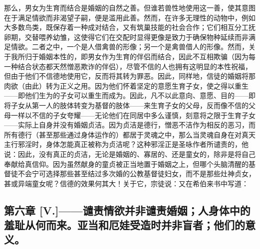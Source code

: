 那么，男女为生育而结合是婚姻的自然之善。但谁若兽性地使用这一善，使其意图在于满足情欲而非渴望子嗣，便是滥用此善。然而，在许多无理性的动物中，例如大多数鸟类，既保存着一种成对结合，又有筑巢技能的社会合作；它们相互分工抚卵期，交替喂养幼雏，这使得它们在交配时显得更像是致力于确保物种延续而非满足情欲。二者之中，一个是人借禽兽的形像；另一个是禽兽借人的形像。然而，关于我所归于婚姻本性的，即男女作为生育的伴侣而结合，因此不互相欺骗（因为每一种结合状态都天然憎恶欺诈的伴侣），尽管不信的人也拥有这明显的本性祝福，但由于他们不信德地使用它，反而将其转为罪恶。因此，同样地，信徒的婚姻将那肉欲（由此）转为正义之用。因为他们怀着坚定的意愿生育子女，使之得以重生——即他们生为的子女可以重生而成为。因此，凡不以此意向、意愿、目的——即将子女从第一人的肢体转变为基督的肢体——来生育子女的父母，反而像不信的父母一样以不信的子女夸耀——无论他们在同居中多么谨慎，刻意将之限于生育子女——实际上自身并没有婚姻贞洁。因为贞洁是德行，憎恶不洁作为相反的恶习，而所有德行（甚至那些通过身体运作的）都居于灵魂之中，那么当灵魂自身在对真天主行邪淫时，身体怎能真正被称为贞洁呢？这种邪淫正是圣咏作者所谴责的，他说：因此，没有真正的贞洁，无论是婚姻的、寡居的、还是童女的，除非是将自己奉献给真信仰。因为虽然献身的童贞被正当地置于婚姻之上，但哪个头脑清醒的基督徒不会宁可选择那些甚至结过多次婚的公教基督徒妇女，而不是那些灶神贞女，甚或异端童女呢？信德的效果何其大！关于它，宗徒说：又在希伯来书中写道：\par


\subsection{第六章 [V.]——谴责情欲并非谴责婚姻；人身体中的羞耻从何而来。亚当和厄娃受造时并非盲者；他们的意义。}

